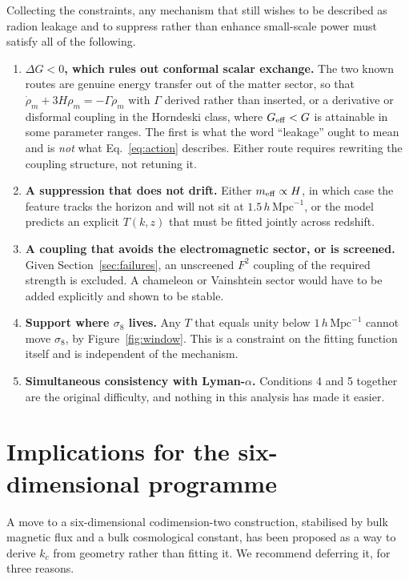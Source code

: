 \documentclass[11pt,a4paper]{article}
\newcommand{\hMpc}{h\,\mathrm{Mpc}^{-1}}
\newcommand{\Geff}{G_{\rm eff}}
\newcommand{\meff}{m_{\rm eff}}
\begin{document}
Collecting the constraints, any mechanism that still wishes to be described as
radion leakage and to suppress rather than enhance small-scale power must satisfy
all of the following.

\begin{enumerate}[leftmargin=1.6em,itemsep=4pt]
\item \textbf{$\Delta G<0$, which rules out conformal scalar exchange.} The two
known routes are genuine energy transfer out of the matter sector, so that
$\dot\rho_m+3H\rho_m=-\Gamma\rho_m$ with $\Gamma$ derived rather than inserted, or a
derivative or disformal coupling in the Horndeski class, where $\Geff<G$ is
attainable in some parameter ranges. The first is what the word ``leakage'' ought to
mean and is \emph{not} what Eq.~\eqref{eq:action} describes. Either route requires
rewriting the coupling structure, not retuning it.

\item \textbf{A suppression that does not drift.} Either $\meff\propto H$, in which
case the feature tracks the horizon and will not sit at $1.5\,\hMpc$, or the model
predicts an explicit $T(k,z)$ that must be fitted jointly across redshift.

\item \textbf{A coupling that avoids the electromagnetic sector, or is screened.}
Given Section~\ref{sec:failures}, an unscreened $F^2$ coupling of the required
strength is excluded. A chameleon or Vainshtein sector would have to be added
explicitly and shown to be stable.

\item \textbf{Support where $\sigma_8$ lives.} Any $T$ that equals unity below
$1\,\hMpc$ cannot move $\sigma_8$, by Figure~\ref{fig:window}. This is a constraint
on the fitting function itself and is independent of the mechanism.

\item \textbf{Simultaneous consistency with Lyman-$\alpha$.} Conditions 4 and 5
together are the original difficulty, and nothing in this analysis has made it
easier.
\end{enumerate}

\section{Implications for the six-dimensional programme}\label{sec:6d}

A move to a six-dimensional codimension-two construction, stabilised by bulk
magnetic flux and a bulk cosmological constant, has been proposed as a way to derive
$k_c$ from geometry rather than fitting it. We recommend deferring it, for three
reasons.
\end{document}
